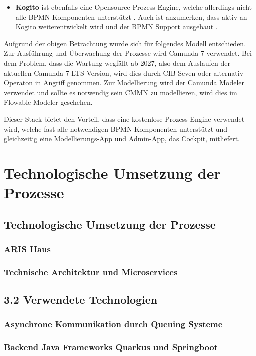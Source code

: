 \begin{itemize}
    \item \textbf{Kogito} ist ebenfalls eine Opensource Prozess Engine, welche allerdings nicht alle \ac{BPMN} Komponenten unterstützt \citep[vgl.][5.2.2]{kogito_kogito_2024-1}. Auch ist anzumerken, dass aktiv an Kogito weiterentwickelt wird und der \ac{BPMN} Support ausgebaut \citep[vgl.][]{redhat_release_2024}. 
\end{itemize}

Aufgrund der obigen Betrachtung wurde sich für folgendes Modell entschieden. Zur Ausführung und Überwachung der Prozesse wird Camunda 7 verwendet. Bei dem Problem, dass die Wartung wegfällt ab 2027, also dem Auslaufen der aktuellen Camunda 7 LTS Version, wird dies durch CIB Seven oder alternativ Operaton in Angriff genommen. Zur Modellierung wird der Camunda Modeler verwendet und sollte es notwendig sein \ac{CMMN} zu modellieren, wird dies im Flowable Modeler geschehen. 

Dieser Stack bietet den Vorteil, dass eine kostenlose Prozess Engine verwendet wird, welche fast alle notwendigen \ac{BPMN} Komponenten unterstützt und gleichzeitig eine Modellierungs-App und Admin-App, das Cockpit, mitliefert.

\section{Technologische Umsetzung der Prozesse}
\subsection{Technologische Umsetzung der Prozesse}
\subsubsection{ARIS Haus}
\subsubsection{Technische Architektur und Microservices}
\label{sec:technische_architektur}

\subsection{3.2 Verwendete Technologien}
\subsubsection{Asynchrone Kommunikation durch Queuing Systeme}
\subsubsection{Backend Java Frameworks Quarkus und Springboot}
